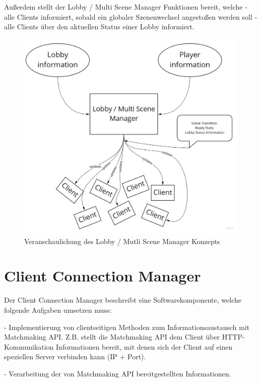 Außerdem stellt der Lobby / Multi Scene Manager Funktionen bereit, welche
- alle Clients informiert, sobald ein globaler Szenenwechsel angestoßen werden soll
- alle Clients über den aktuellen Status einer Lobby informiert.

\begin{figure}
	\centering
	\includegraphics[width=150mm]{images/Lobby_Multi_Scene_Manager.jpg}
	\caption[Lobby / Mutli Scene Manager Diagramm]{Veranschaulichung des Lobby / Mutli Scene Manager Konzepts}
	\label{pic:Lobby_Multi_Scene_Manager}
\end{figure}


\section{Client Connection Manager}

Der Client Connection Manager beschreibt eine Softwarekomponente, welche folgende Aufgaben umsetzen muss:

- Implementierung von clientseitigen Methoden zum Informationsaustausch mit Matchmaking API.
Z.B. stellt die Matchmaking API dem Client über HTTP-Kommunikation Informationen bereit, mit denen sich der Client auf einen speziellen Server verbinden kann (IP + Port). \cite{Wikipedia.2021d} \cite{Wikipedia.2021e}

- Verarbeitung der von Matchmaking API bereitgestellten Informationen. 

